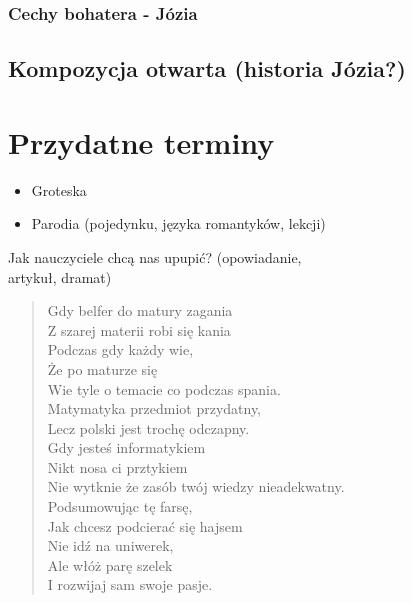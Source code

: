 \documentclass[a4paper]{article}
\begin{document}
\subsubsection{Cechy bohatera - Józia}
\subsection{Kompozycja otwarta (historia Józia?)}
\section{Przydatne terminy}
\begin{itemize}
    \item Groteska
    \item Parodia (pojedynku, języka romantyków, lekcji)
\end{itemize}
 Jak nauczyciele chcą nas upupić? (opowiadanie,\\ artykuł, dramat)
\begin{quote}
Gdy belfer do matury zagania \\
Z szarej materii robi się kania \\
Podczas gdy każdy wie, \\
Że po maturze się \\
Wie tyle o temacie co podczas spania. \\
Matymatyka przedmiot przydatny, \\
Lecz polski jest trochę odczapny. \\
Gdy jesteś informatykiem \\
Nikt nosa ci prztykiem \\
Nie wytknie że zasób twój wiedzy nieadekwatny. \\
Podsumowując tę farsę, \\
Jak chcesz podcierać się hajsem \\
Nie idź na uniwerek, \\
Ale włóż parę szelek \\
I rozwijaj sam swoje pasje.
\end{quote}
\end{document}

